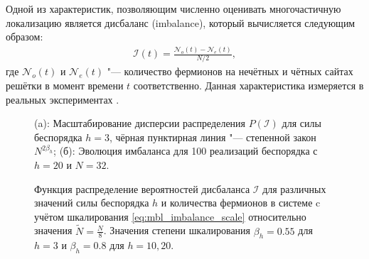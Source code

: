 Одной из характеристик, позволяющим численно оценивать многочастичную локализацию является дисбаланс (imbalance), который вычисляется следующим образом:
\begin{equation}
\label{eq:mbl_imbalance}
\begin{gathered}
\mathcal{I}(t) = \frac{\mathcal{N}_o(t) - \mathcal{N}_e(t)}{N/2},
\end{gathered}
\end{equation}
где \(\mathcal{N}_o(t)\) и \(\mathcal{N}_e(t)\) "--- количество фермионов на нечётных и чётных сайтах решётки в момент времени \(t\) соответственно. Данная характеристика измеряется в реальных экспериментах \cite{Schreiber2015, Choi2016, Bordia2017, Lschen2017}.
\begin{figure}[h]
	\legend{}
	\caption[Масштабирование дисперсии распределения дисбаланса и его эволюция во времени в модели MBL]
	{
		(a): Масштабирование дисперсии распределения \( P(\mathcal{I}) \) для силы беспорядка \(h=3\), чёрная пунктирная линия "--- степенной закон \(N^{2 \beta_h}\); (б): Эволюция имбаланса для 100 реализаций беспорядка с \(h=20\) и \(N=32\).
	}
	\label{fig:mbl_imbalance_1}
\end{figure}
\begin{figure}[h]
	\caption[Плотность распределения дисбаланса для разных значений беспорядка и разного количества частиц]{
		Функция распределение вероятностей дисбаланса \(\mathcal{I}\) для различных значений силы беспорядка \(h\) и количества фермионов в системе c учётом шкалирования \cref{eq:mbl_imbalance_scale} относительно значения \(\tilde{N} = \frac{N}{8}\). Значения степени шкалирования \(\beta_h = 0.55\) для \(h=3\) и \(\beta_h = 0.8\) для \(h=10, 20\).
	}
	\label{fig:mbl_imbalance_2}
\end{figure}

